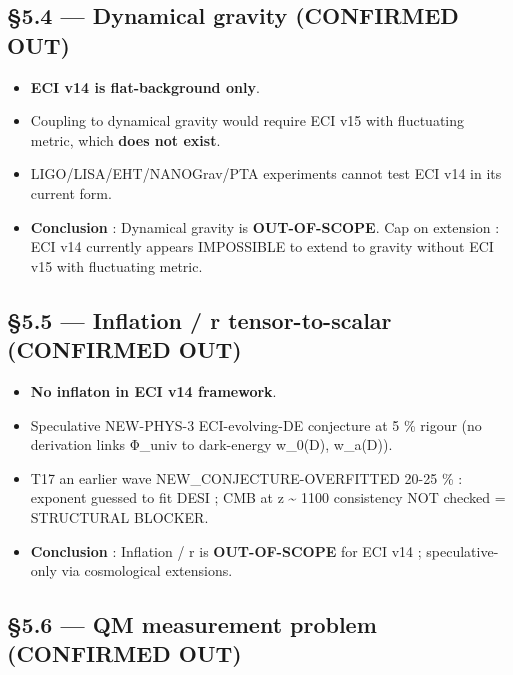 \documentclass[
  11pt,
  a4paper,
]{article}
\providecommand{\tightlist}{\setlength{\itemsep}{0pt}\setlength{\parskip}{0pt}}
\providecommand{\tightlist}{%
  \setlength{\itemsep}{0pt}\setlength{\parskip}{0pt}}
\begin{document}
\hypertarget{dynamical-gravity-confirmed-out}{%
\subsection{§5.4 --- Dynamical gravity (CONFIRMED OUT)}\label{dynamical-gravity-confirmed-out}}

\begin{itemize}
\tightlist
\item
  \textbf{ECI v14 is flat-background only}.
\item
  Coupling to dynamical gravity would require ECI v15 with fluctuating metric, which \textbf{does not exist}.
\item
  LIGO/LISA/EHT/NANOGrav/PTA experiments cannot test ECI v14 in its current form.
\item
  \textbf{Conclusion} : Dynamical gravity is \textbf{OUT-OF-SCOPE}. Cap on extension : ECI v14 currently appears IMPOSSIBLE to extend to gravity without ECI v15 with fluctuating metric.
\end{itemize}

\hypertarget{inflation-r-tensor-to-scalar-confirmed-out}{%
\subsection{§5.5 --- Inflation / r tensor-to-scalar (CONFIRMED OUT)}\label{inflation-r-tensor-to-scalar-confirmed-out}}

\begin{itemize}
\tightlist
\item
  \textbf{No inflaton in ECI v14 framework}.
\item
  Speculative NEW-PHYS-3 ECI-evolving-DE conjecture at 5 \% rigour (no derivation links Φ\_univ to dark-energy w\_0(D), w\_a(D)).
\item
  T17 an earlier wave NEW\_CONJECTURE-OVERFITTED 20-25 \% : exponent guessed to fit DESI ; CMB at z \textasciitilde{} 1100 consistency NOT checked = STRUCTURAL BLOCKER.
\item
  \textbf{Conclusion} : Inflation / r is \textbf{OUT-OF-SCOPE} for ECI v14 ; speculative-only via cosmological extensions.
\end{itemize}

\hypertarget{qm-measurement-problem-confirmed-out}{%
\subsection{§5.6 --- QM measurement problem (CONFIRMED OUT)}\label{qm-measurement-problem-confirmed-out}}
\end{document}

